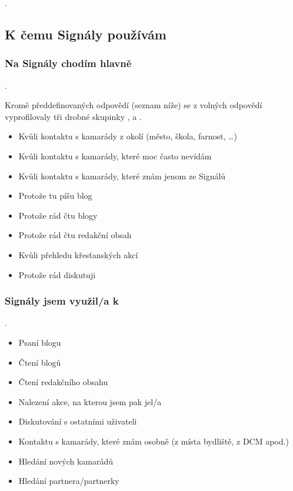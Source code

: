 \qtype \pickOne.


\subsection{K čemu Signály používám}\label{sec:kcemu}

\subsubsection{Na Signály chodím hlavně}

\qtype \pickMultiple \withOther.

Kromě předdefinovaných odpovědí (seznam níže)
se z volných odpovědí vyprofilovaly tři drobné skupinky
,  a .

\begin{itemize}
\item Kvůli kontaktu s kamarády z okolí (město, škola, farnost, …)
\item Kvůli kontaktu s kamarády, které moc často nevídám
\item Kvůli kontaktu s kamarády, které znám jenom ze Signálů
\item Protože tu píšu blog
\item Protože rád čtu blogy
\item Protože rád čtu redakční obsah
\item Kvůli přehledu křesťanských akcí
\item Protože rád diskutuji
\end{itemize}


\subsubsection{Signály jsem využil/a k}

\qtype \pickMultiple \withOther.

\begin{itemize}
\item Psaní blogu
\item Čtení blogů
\item Čtení redakčního obsahu
\item Nalezení akce, na kterou jsem pak jel/a
\item Diskutování s ostatními uživateli
\item Kontaktu s kamarády, které znám osobně (z místa bydliště, z DCM apod.)
\item Hledání nových kamarádů
\item Hledání partnera/partnerky
\end{itemize}

